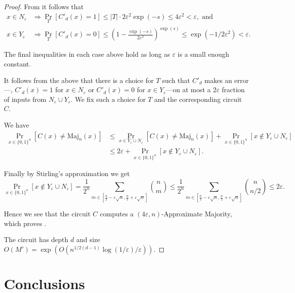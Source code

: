 \documentclass{toc}
\newcommand{\prob}[2]{\mathop{\mathrm{Pr}}_{#1}[#2]}
\begin{document}
\begin{proof}
{}From  it follows that 
\begin{align*}
x\in N_\varepsilon &\Rightarrow \prob{T}{C'_d(x) = 1}\leq |T|\cdot 2\varepsilon^2\exp(-s) \leq 4\varepsilon^2 < \varepsilon, \text{ and }\\
x\in Y_\varepsilon &\Rightarrow \prob{T}{C'_d(x) = 0}\leq \left(1-\frac{\exp(-s)}{2\varepsilon^2}\right)^{\exp(s)} \leq \exp(-1/2\varepsilon^2) < \varepsilon.
\end{align*}

The final inequalities in each case above hold as long as $\varepsilon$ is a small enough constant. 

It follows from the above that there is a choice for $T$ such that $C'_d$ makes an error---\ie, $C'_d(x) = 1$ for $x\in N_\varepsilon$ or $C'_d(x) = 0$ for $x\in Y_\varepsilon$---on at most a $2\varepsilon$ fraction of inputs from  $N_\varepsilon\cup Y_\varepsilon$. We fix such a choice for $T$ and the corresponding circuit $C$. 

We have 
\begin{align*}
\prob{x\in \{0,1\}^n}{C(x) \neq \mathrm{Maj}_n(x)}&\leq \prob{x\in Y_\varepsilon\cup N_\varepsilon}{C(x) \neq \mathrm{Maj}_n(x)} + \prob{x\in\{0,1\}^n}{x\not\in Y_\varepsilon\cup N_\varepsilon}\\
&\leq 2\varepsilon + \prob{x\in\{0,1\}^n}{x\not\in Y_\varepsilon\cup N_\varepsilon}.
\end{align*}

Finally by Stirling's approximation we get
\[
\prob{x\in\{0,1\}^n}{x\not\in Y_\varepsilon\cup N_\varepsilon} = \frac{1}{2^n}\sum_{m\in [\frac{n}{2}-\varepsilon\sqrt{n}, \frac{n}{2}+\varepsilon\sqrt{n}]}\binom{n}{m} \leq \frac{1}{2^n}\sum_{m\in [\frac{n}{2}-\varepsilon\sqrt{n}, \frac{n}{2}+\varepsilon\sqrt{n}]}\binom{n}{n/2} \leq 2\varepsilon.
\]

Hence we see that the circuit $C$ computes a $(4\varepsilon,n)$-Approximate Majority, which proves .

The circuit has depth $d$ and size $O(M') = \exp(O(n^{1/2(d-1)}\log(1/\varepsilon)/\varepsilon))$.
\end{proof}



\section{Conclusions}
\label{sec:conclusion}
\end{document}
